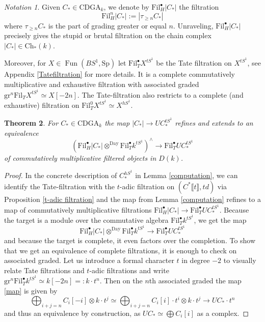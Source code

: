 \documentclass[10pt, reqno]{amsart}
\newtheorem{theorem}{Theorem}[section]
\theoremstyle{definition}
\theoremstyle{remark}
\newtheorem{notation}[theorem]{Notation}
\newcommand{\Sp}{\mathrm{Sp}}
\newcommand{\Fil}{\mathrm{Fil}}
\newcommand{\llrrbra}[1]{\llbracket #1\rrbracket}
\newcommand{\gr}{\mathrm{gr}}
\newcommand{\Ch}{\mathrm{Ch}}
\newcommand{\Day}{\mathrm{Day}}
\newcommand{\CDGA}{\mathrm{CDGA}}
\DeclareMathOperator{\Fun}{\mathrm{Fun}}
\begin{document}
\begin{notation}
	Given $C_*\in\CDGA_k$, we denote by $\Fil^\bullet_H|C_*|$ the filtration
	\[\Fil^n_H|C_*|:=|\tau_{\geq n}C_*|\]
	where $\tau_{\geq n}C_*$ is the part of grading greater or equal $n$.
	Unraveling, $\Fil^\bullet_H|C_*|$ precisely gives the stupid or brutal filtration on the chain complex $|C_*|\in\Ch_*(k)$.
	
	Moreover, for $X\in\Fun(BS^1,\Sp)$ let $\Fil^\bullet_T X^{tS^1}$ be the Tate filtration on $X^{tS^1}$, see Appendix \ref{Tatefiltration} for more details. It is a complete commutatively multiplicative and exhaustive filtration with associated graded $\gr^n\Fil_T X^{tS^1}\simeq X[-2n]$. The Tate-filtration also restricts to a complete (and exhaustive) filtration on $\Fil_T^0X^{tS^1}\simeq X^{hS^1}$.
\end{notation}

\begin{theorem}\label{generalfiltration}
	For $C_*\in\CDGA_k$ the map $|C_*|\to UC_*^{tS^1}$ refines and extends to an equivalence
	\[\left(\Fil^\bullet_H|C_*|\otimes^\Day\Fil^\bullet_Tk^{tS^1}\right)^\wedge\to\Fil^\bullet_TUC_*^{tS^1}\]
	of commutatively multiplicative filtered objects in $D(k)$.
\end{theorem}
\begin{proof}
	In the concrete description of $C_*^{hS^1}$ in Lemma \ref{computation}, we can identify the Tate-filtration with the $t$-adic filtration on $(C^*\llrrbra t,td)$ via Proposition \ref{t-adic filtration} and the map from Lemma \ref{computation} refines to a map of commutatively multiplicative filtrations $\Fil^\bullet_H|C_*|\to\Fil_T^\bullet UC_*^{tS^1}$. Because the target is a module over the commutative algebra $\Fil^\bullet_Tk^{tS^1}$, we get the map 
	\begin{equation}\Fil^\bullet_H|C_*|\otimes^\Day\Fil^\bullet_Tk^{tS^1}\to\Fil^\bullet_TUC_*^{tS^1}\label{map}\end{equation}
	and because the target is complete, it even factors over the completion. To show that we get an equivalence of complete filtrations, it is enough to check on associated graded. Let us introduce a formal character $t$ in degree $-2$ to visually relate Tate filtrations and $t$-adic filtrations and write $\gr^n\Fil^\bullet_Tk^{tS^1}\simeq k[-2n]=:k\cdot t^n$. Then on the $n$th associated graded the map \eqref{map} is given by 
	\[\bigoplus_{i+j=n} C_i[-i]\otimes k\cdot t^j\simeq\bigoplus_{i+j=n} C_i[i]\cdot t^i\otimes k\cdot t^j\to UC_*\cdot t^n\]
	and thus an equivalence by construction, as $UC_*\simeq \bigoplus C_i[i]$ as a complex.
\end{proof}
\end{document}
